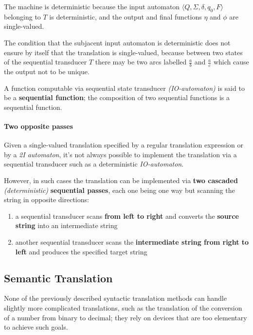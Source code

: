 \documentclass[english]{article}
\begin{document}
\bigskip
The machine is deterministic because the input automaton \(\langle Q, \Sigma, \delta, q_0, F \rangle\) belonging to \(T\) is deterministic, and the output and final functions \(\eta\) and \(\phi\) are single-valued.

The condition that the subjacent input automaton is deterministic does not ensure by itself that the translation is single-valued, because between two states of the sequential transducer \(T\) there may be two arcs labelled \(\frac{a}{b}\) and \(\frac{a}{c}\) which cause the output not to be unique.

A function computable via sequential state transducer \textit{(IO-automaton)} is said to be a \textbf{sequential function};
the composition of two sequential functions is a sequential function.

\paragraph{Two opposite passes}

Given a single-valued translation specified by a regular translation expression or by a \textit{2I automaton}, it's not always possible to implement the translation via a sequential transducer such as a deterministic \textit{IO-automaton}.

However, in such cases the translation can be implemented via \textbf{two cascaded} \textit{(deterministic)} \textbf{sequential passes}, each one being one way but scanning the string in opposite directions:

\begin{enumerate}[label=step \arabic*., ref=(step \arabic*), leftmargin=*, widest=step 2.]
  \item a sequential transducer scans \textbf{from left to right} and converts the \textbf{source string} into an intermediate string
  \item another sequential transducer scans the \textbf{intermediate string from right to left} and produces the specified target string
\end{enumerate}

\subsection{Semantic Translation}

None of the previously described syntactic translation methods can handle slightly more complicated translations, such as the translation of the conversion of a number from binary to decimal;
they rely on devices that are too elementary to achieve such goals.
\end{document}
